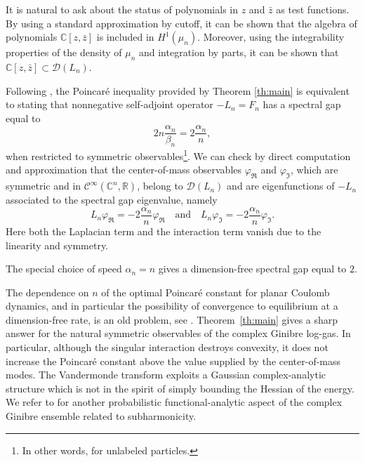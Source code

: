 \documentclass[11pt,reqno]{amsart}
\numberwithin{equation}{section}%
\numberwithin{figure}{section}%
\numberwithin{table}{section}
\theoremstyle{plain}
\theoremstyle{definition}
\begin{document}
It is natural to ask about the status of polynomials in $z$ and $\bar{z}$ as
test functions. By using a standard approximation by cutoff, it can be shown
that the algebra of polynomials $\mathbb{C}[z,\bar{z}]$ is included in
$H^1(\mu_n)$. Moreover, using the integrability properties of the density of
$\mu_n$ and integration by parts, it can be shown that
$\mathbb{C}[z,\bar{z}]\subset\mathcal{D}(L_n)$.

Following \cite[Ch.~4]{BakryGentilLedoux}, the Poincaré inequality
provided by Theorem \ref{th:main} is equivalent to stating that nonnegative
self-adjoint operator $-L_n=F_n$ has a spectral gap equal to
\begin{equation}
  2n\frac{\alpha_n}{\beta_n}=2\frac{\alpha_n}{n},
\end{equation}
when restricted to symmetric observables\footnote{In other words, for
  unlabeled particles.}. We can check by direct computation and approximation
that the center-of-mass observables $\varphi_\Re$ and $\varphi_\Im$, which are
symmetric and in $\mathcal{C}^\infty(\mathbb{C}^n,\mathbb{R})$, belong to
$\mathcal{D}(L_n)$ and are eigenfunctions of $-L_n$ associated to the spectral
gap eigenvalue, namely
\begin{equation}
  L_n\varphi_\Re=-2\frac{\alpha_n}{n}\varphi_\Re
  \quad\text{and}\quad
  L_n\varphi_\Im=-2\frac{\alpha_n}{n}\varphi_\Im.
\end{equation}
Here both the Laplacian term and the interaction term vanish due to the
linearity and symmetry.

The special choice of speed $\alpha_n=n$ gives a dimension-free spectral gap
equal to $2$.

The dependence on $n$ of the optimal Poincaré constant for planar Coulomb
dynamics, and in particular the possibility of convergence to equilibrium at a
dimension-free rate, is an old problem, see
\cite*{BolleyChafaiFontbona,LuMattingly,RosenzweigSerfatyModulatedLSI}.
Theorem~\ref{th:main} gives a sharp answer for the natural symmetric
observables of the complex Ginibre log-gas. In particular, although the
singular interaction destroys convexity, it does not increase the Poincaré
constant above the value supplied by the center-of-mass modes. The Vandermonde
transform exploits a Gaussian complex-analytic structure which is not in the
spirit of simply bounding the Hessian of the energy. We refer to
\cite{DePhilippisShenfeld} for another probabilistic functional-analytic
aspect of the complex Ginibre ensemble related to subharmonicity.
\end{document}
